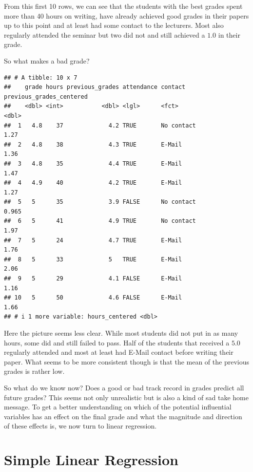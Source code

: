 \documentclass[
]{book}
\begin{document}
From this first 10 rows, we can see that the students with the best grades spent
more than 40 hours on writing, have already achieved good grades in their papers
up to this point and at least had some contact to the lecturers. Most also
regularly attended the seminar but two did not and still achieved a \(1.0\) in
their grade.

So what makes a bad grade?

\begin{verbatim}
## # A tibble: 10 x 7
##    grade hours previous_grades attendance contact    previous_grades_centered
##    <dbl> <int>           <dbl> <lgl>      <fct>                         <dbl>
##  1   4.8    37             4.2 TRUE       No contact                    1.27 
##  2   4.8    38             4.3 TRUE       E-Mail                        1.36 
##  3   4.8    35             4.4 TRUE       E-Mail                        1.47 
##  4   4.9    40             4.2 TRUE       E-Mail                        1.27 
##  5   5      35             3.9 FALSE      No contact                    0.965
##  6   5      41             4.9 TRUE       No contact                    1.97 
##  7   5      24             4.7 TRUE       E-Mail                        1.76 
##  8   5      33             5   TRUE       E-Mail                        2.06 
##  9   5      29             4.1 FALSE      E-Mail                        1.16 
## 10   5      50             4.6 FALSE      E-Mail                        1.66 
## # i 1 more variable: hours_centered <dbl>
\end{verbatim}

Here the picture seems less clear. While most students did not put in as many
hours, some did and still failed to pass. Half of the students that received a
\(5.0\) regularly attended and most at least had E-Mail contact before writing
their paper. What seems to be more consistent though is that the mean of the
previous grades is rather low.

So what do we know now? Does a good or bad track record in grades predict all
future grades? This seems not only unrealistic but is also a kind of sad take home
message. To get a better understanding on which of the potential influential
variables has an effect on the final grade and what the magnitude and direction
of these effects is, we now turn to linear regression.

\hypertarget{simple-linear-regression}{%
\section{Simple Linear Regression}\label{simple-linear-regression}}
\end{document}
